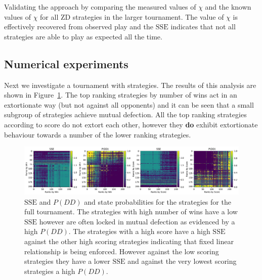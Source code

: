 \documentclass[a4paper]{article}
\newcommand{\SSe}{\text{SSE}}
\begin{document}
\begin{table}[!hbtp]
    \begin{center}
   
    \end{center}
    \caption{Validating the approach by comparing the measured values of \(\chi\) and the known values of
    \(\chi\) for all ZD strategies in the larger tournament. The value of
    \(\chi\) is effectively recovered from observed play and the \(\SSe\)
    indicates that not all strategies are able to play as expected all the
time.}
    \label{tbl:chi_versus_observed_chi_for_zd}
\end{table}

\subsection{Numerical experiments}

Next we investigate a tournament with
strategies. The results of
this analysis are shown in Figure~\ref{fig:sse_chi_probabilities_in_full}. The
top ranking strategies by number of wins act in an extortionate way (but not
against all opponents) and it can be seen that a small subgroup of strategies
achieve mutual defection.  All the top ranking strategies according to score
do not extort each other, however they
\textbf{do} exhibit extortionate behaviour towards a number of the lower ranking
strategies.

\begin{figure}[!htbp]
    \centering
    \includegraphics[width=.95\textwidth]{./assets/img/sse_chi_probabilities_in_full/main.pdf}
    \caption{\(\SSe\) and \(P(DD)\) and state probabilities for the strategies for
        the full tournament. The strategies with high number of wins
        have a low \(\SSe\) however are often locked in mutual defection as
        evidenced by a high \(P(DD)\). The strategies with a high score
        have a high \(\SSe\) against the other high scoring strategies
        indicating that fixed linear relationship is being enforced. However
        against the low scoring strategies they have a lower \(\SSe\) and
        against the very lowest scoring strategies a high \(P(DD)\).}
    \label{fig:sse_chi_probabilities_in_full}
\end{figure}
\end{document}

